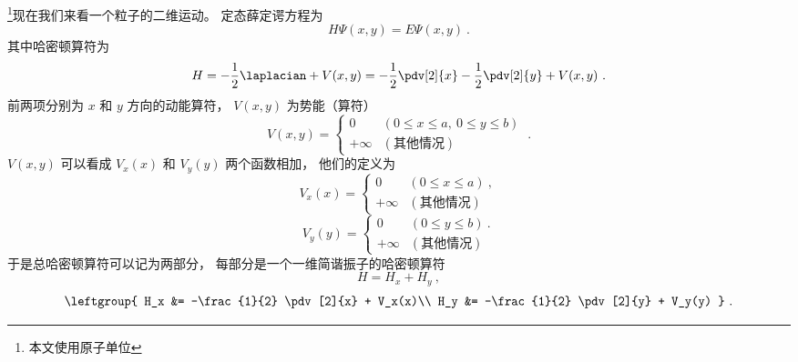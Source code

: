 

\footnote{本文使用原子单位}现在我们来看一个粒子的二维运动。 定态薛定谔方程为
\begin{equation}\label{eq_ISW2D_1}
H \Psi(x, y) = E \Psi(x, y)~.
\end{equation}
其中哈密顿算符为
\begin{equation}
H = -\frac{1}{2} \laplacian + V(x, y) =  -\frac{1}{2} \pdv[2]{x} -\frac{1}{2} \pdv[2]{y}  + V(x, y)~.
\end{equation}
前两项分别为 $x$ 和 $y$ 方向的动能算符， $V(x, y)$ 为势能（算符）
\begin{equation}
V(x, y) =
\begin{cases}
0  & (0 \leqslant x \leqslant a,\: 0 \leqslant y \leqslant b)\\
+\infty & (\text{其他情况})
\end{cases}~.
\end{equation}
$V(x, y)$ 可以看成 $V_x(x)$ 和 $V_y(y)$ 两个函数相加， 他们的定义为
\begin{equation}
V_x(x) =
\begin{cases}
0  & (0 \leqslant x \leqslant a)~,\\
+\infty & (\text{其他情况})
\end{cases}
\end{equation}
\begin{equation}
V_y(y) =
\begin{cases}
0  & (0 \leqslant y \leqslant b)~.\\
+\infty & (\text{其他情况})
\end{cases}
\end{equation}
于是总哈密顿算符可以记为两部分， 每部分是一个一维简谐振子的哈密顿算符
\begin{equation}
H = H_x + H_y~,
\end{equation}
\begin{equation}
\leftgroup{
H_x &= -\frac{1}{2} \pdv[2]{x} + V_x(x)\\
H_y &= -\frac{1}{2} \pdv[2]{y} + V_y(y)
}~.
\end{equation}

